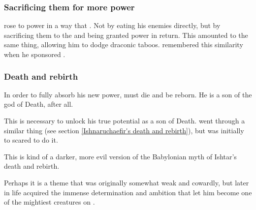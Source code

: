\subsubsection{Sacrificing them for more power}
\Secherdamon rose to power in a way that .
Not by eating his enemies directly, but by sacrificing them to the \xss and being granted power in return.
This amounted to the same thing, allowing him to dodge draconic taboos.
\Secherdamon remembered this similarity when he sponsored \Narkiza.






\subsubsection{Death and rebirth}
In order to fully absorb his new power, \HriistD{} must die and be reborn. 
He is a son of the god of Death, after all. 

This is necessary to unlock his true potential as a son of Death. \Ishnaruchaefir{} went through a similar thing (see section \ref{Ishnaruchaefir's death and rebirth}), but \HriistD{} was initially to scared to do it. 

This is kind of a darker, more evil version of the Babylonian myth of Ishtar's death and rebirth. 

Perhaps it is a theme that \Secherdamon{} was originally somewhat weak and cowardly, but later in life acquired the immense determination and ambition that let him become one of the mightiest creatures on \Miith{}. 





